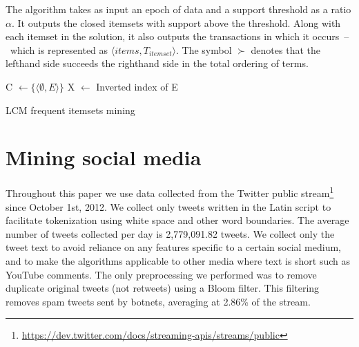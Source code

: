 \documentclass{sig-alternate}
\begin{document}
The algorithm takes as input an epoch of data and a support threshold as a
ratio $\alpha$.
It outputs the closed itemsets with support above the threshold.
Along with each itemset in the solution, it also outputs the transactions
in which it occurs~--~which is represented as $\langle items,
T_{itemset} \rangle$.
The symbol $\succ$ denotes that the lefthand side  succeeds the righthand
side in the total ordering of terms. 

\begin{algorithm}
\SetAlgoLined
\LinesNumbered
{}

C $\gets \{\langle \emptyset, E\rangle\}$ 
X $\gets$ Inverted index of E\;
\;


\caption{LCM frequent itemsets mining}
\label{algo:lcmix}
\end{algorithm}

\section{Mining social media}
\label{sec:socmine}

Throughout this paper we use data collected from the Twitter public
stream\footnote{\scriptsize \url{https://dev.twitter.com/docs/streaming-apis/streams/public}}
since October 1st, 2012. 
We collect only tweets written in the Latin script to facilitate tokenization
using white space and other word boundaries.
The average number of tweets collected per day is 2,779,091.82 tweets.
We collect only the tweet text to avoid reliance on any features specific to a
certain social medium,
and to make the algorithms applicable to other media where text is short  
such as YouTube comments.
The only preprocessing we performed was to remove duplicate original tweets
(not retweets) using a Bloom filter.
This filtering removes spam tweets sent by botnets, averaging at 2.86\% of the stream. 
\end{document}
